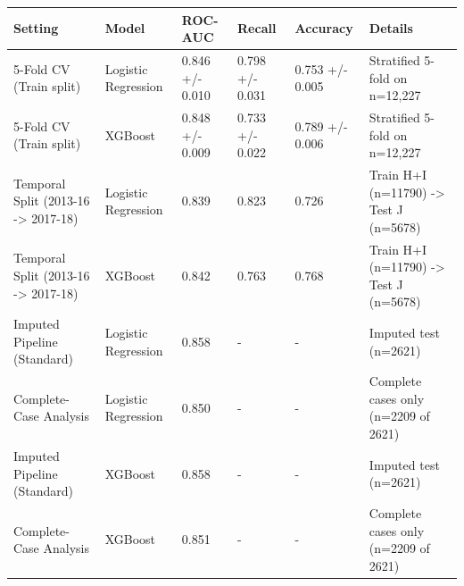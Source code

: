 \begin{tabular}{llllll}
\toprule
Setting & Model & ROC-AUC & Recall & Accuracy & Details \\
\midrule
5-Fold CV (Train split) & Logistic Regression & 0.846 +/- 0.010 & 0.798 +/- 0.031 & 0.753 +/- 0.005 & Stratified 5-fold on n=12,227 \\
5-Fold CV (Train split) & XGBoost & 0.848 +/- 0.009 & 0.733 +/- 0.022 & 0.789 +/- 0.006 & Stratified 5-fold on n=12,227 \\
Temporal Split (2013-16 -> 2017-18) & Logistic Regression & 0.839 & 0.823 & 0.726 & Train H+I (n=11790) -> Test J (n=5678) \\
Temporal Split (2013-16 -> 2017-18) & XGBoost & 0.842 & 0.763 & 0.768 & Train H+I (n=11790) -> Test J (n=5678) \\
Imputed Pipeline (Standard) & Logistic Regression & 0.858 & - & - & Imputed test (n=2621) \\
Complete-Case Analysis & Logistic Regression & 0.850 & - & - & Complete cases only (n=2209 of 2621) \\
Imputed Pipeline (Standard) & XGBoost & 0.858 & - & - & Imputed test (n=2621) \\
Complete-Case Analysis & XGBoost & 0.851 & - & - & Complete cases only (n=2209 of 2621) \\
\bottomrule
\end{tabular}
